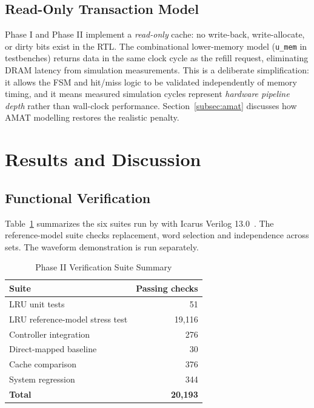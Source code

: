 \documentclass[conference]{IEEEtran}
\begin{document}
\subsection{Read-Only Transaction Model}
\label{subsec:readonly}

Phase I and Phase II implement a \emph{read-only} cache: no write-back,
write-allocate, or dirty bits exist in the RTL.
The combinational lower-memory model ({\tt u\_mem} in testbenches) returns
data in the same clock cycle as the refill request, eliminating DRAM
latency from simulation measurements.
This is a deliberate simplification: it allows the FSM and hit/miss logic
to be validated independently of memory timing, and it means measured
simulation cycles represent \emph{hardware pipeline depth} rather than
wall-clock performance.
Section~\ref{subsec:amat} discusses how AMAT modelling restores the
realistic penalty.

\section{Results and Discussion}
\label{sec:results}

\subsection{Functional Verification}
\label{subsec:verification}

Table~\ref{tab:suites} summarizes the six suites run by
 with Icarus Verilog 13.0~\cite{icarus-verilog}.
The reference-model suite checks replacement, word selection and
independence across sets. The waveform demonstration is run separately.

\begin{table}[h]
  \caption{Phase II Verification Suite Summary}
  \label{tab:suites}
  \centering
  \small
  \begin{tabular}{lr}
    \toprule
    Suite & Passing checks \\
    \midrule
    LRU unit tests & 51 \\
    LRU reference-model stress test & 19,116 \\
    Controller integration & 276 \\
    Direct-mapped baseline & 30 \\
    Cache comparison & 376 \\
    System regression & 344 \\
    \midrule
    \textbf{Total} & \textbf{20,193} \\
    \bottomrule
  \end{tabular}
\end{table}
\end{document}
